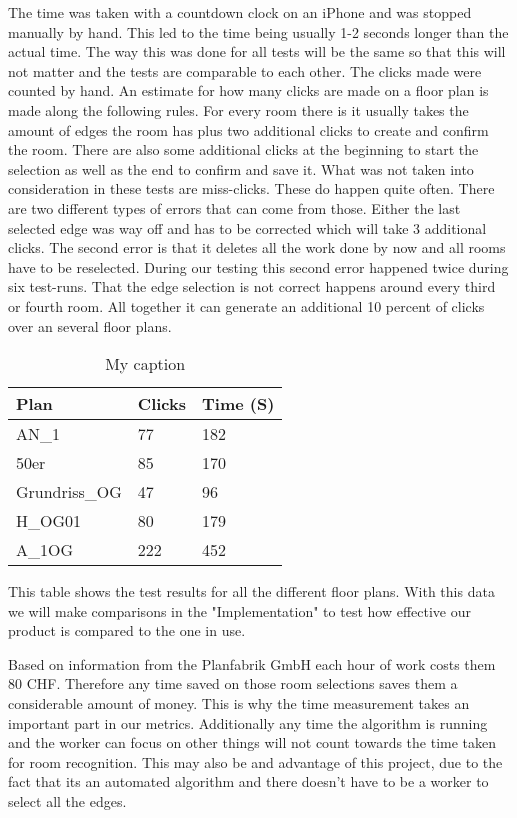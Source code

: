
The time was taken with a countdown clock on an iPhone and was stopped manually by hand. This led to the time being usually 1-2 seconds longer than the actual time. The way this was done for all tests will be the same so that this will not matter and the tests are comparable to each other. The clicks made were counted by hand.
An estimate for how many clicks are made on a floor plan is made along the following rules. For every room there is it usually takes the amount of edges the room has plus two additional clicks to create and confirm the room. There are also some additional clicks at the beginning to start the selection as well as the end to confirm and save it.
What was not taken into consideration in these tests are miss-clicks. These do happen quite often. There are two different types of errors that can come from those. Either the last selected edge was way off and has to be corrected which will take 3 additional clicks. The second error is that it deletes all the work done by now and all rooms have to be reselected. During our testing this second error happened twice during six test-runs. That the edge selection is not correct happens around every third or fourth room. All together it can generate an additional 10 percent of clicks over an several floor plans.


\begin{table}[]
	\centering
	\caption{My caption}
	\label{my-label}
	\begin{tabular}{@{}lll@{}}
		\toprule
		Plan          & Clicks & Time (S) \\ \midrule
		AN\_1         & 77     & 182 \\
		50er          & 85     & 170  \\
		Grundriss\_OG & 47     & 96 \\
		H\_OG01         & 80     & 179 \\
		A\_1OG        & 222    & 452 \\ \bottomrule
	\end{tabular}
\end{table}

This table shows the test results for all the different floor plans. With this data we will make comparisons in the "Implementation" to test how effective our product is compared to the one in use.

Based on information from the Planfabrik GmbH each hour of work costs them 80 CHF. Therefore any time saved on those room selections saves them a considerable amount of money. This is why the time measurement takes an important part in our metrics. Additionally any time the algorithm is running and the worker can focus on other things will not count towards the time taken for room recognition. This may also be and advantage of this project, due to the fact that its an automated algorithm and there doesn't have to be a worker to select all the edges.

